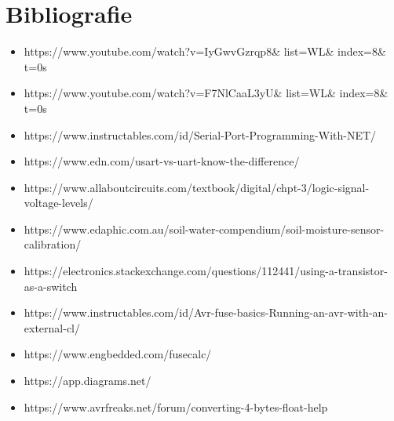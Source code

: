 \documentclass[12pt]{article}
\begin{document}
\section{ Bibliografie}

\begin{itemize}

\item https://www.youtube.com/watch?v=IyGwvGzrqp8\& list=WL\& index=8\& t=0s

\item https://www.youtube.com/watch?v=F7NlCaaL3yU\& list=WL\& index=8\& t=0s

\item https://www.instructables.com/id/Serial-Port-Programming-With-NET/

\item https://www.edn.com/usart-vs-uart-know-the-difference/
\item https://www.allaboutcircuits.com/textbook/digital/chpt-3/logic-signal-voltage-levels/
\item https://www.edaphic.com.au/soil-water-compendium/soil-moisture-sensor-calibration/

\item https://electronics.stackexchange.com/questions/112441/using-a-transistor-as-a-switch
\item https://www.instructables.com/id/Avr-fuse-basics-Running-an-avr-with-an-external-cl/
\item https://www.engbedded.com/fusecalc/
\item https://app.diagrams.net/
\item https://www.avrfreaks.net/forum/converting-4-bytes-float-help

\end{itemize}
\end{document}
